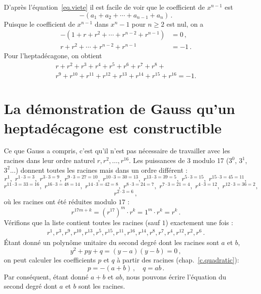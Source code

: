 D'après l'équation~\ref{eq.viete} il est facile de voir que le coefficient de $x^{n-1}$ est 
\[
-(a_1+a_2+\cdots+a_{n-1}+a_n)\,.
\]
Puisque le coefficient de $x^{n-1}$ dans $x^n-1$ pour $n\geq 2$ est nul, on a 
\begin{align*}
-(1+r+r^2+\cdots + r^{n-2}+r^{n-1})&=0\,,\\
r+r^2+\cdots + r^{n-2}+r^{n-1}&=-1\,.
\end{align*}
Pour l'heptadécagone, on obtient
\begin{multline}
r+r^2+r^3+r^4+r^5+r^6+r^7+r^8+\\
r^9+r^{10}+r^{11}+r^{12}+r^{13}+r^{14} + r^{15}+r^{16}=-1.\label{eq.minus-one}
\end{multline}

\section{La démonstration de Gauss qu'un heptadécagone est constructible}\label{s.gauss}

Ce que Gauss a compris, c'est qu'il n'est pas nécessaire de travailler avec les racines dans leur ordre naturel $r,r^2,\ldots,r^{16}$. Les puissances de $3$ modulo 17 ($3^0$, $3^1$, $3^2$...) donnent toutes les racines mais dans un ordre différent :
\[
r^1, \;r^{1\cdot 3 =3},\; r^{3\cdot 3=9},\; r^{9\cdot 3=27=10},\; r^{10\cdot 3=30=13},\; r^{13\cdot 3=39=5},\; r^{5\cdot 3=15},\; r^{15\cdot 3=45=11},\]
\[
r^{11\cdot 3 =33=16}, \;r^{16\cdot 3=48=14},\; r^{14\cdot 3=42=8},\; r^{8\cdot 3=24=7},\;r^{7\cdot 3=21=4},\; r^{4\cdot 3=12},\; r^{12\cdot 3=36=2},\; \]
\[r^{2\cdot 3=6}\,,\]
où les racines ont été réduites modulo $17$ :
\[
r^{17m+k}=(r^{17})^m\cdot r^k=1^m\cdot r^k=r^k\,.
\]
Vérifions que la liste contient toutes les racines (sauf $1$) exactement une fois :
\begin{align}\label{eq.roots}
r^1, r^3, r^9, r^{10}, r^{13}, r^5, r^{15}, r^{11}, r^{16}, r^{14}, r^8, r^7, r^4, r^{12}, r^2, r^6\,.
\end{align}
Étant donné un polynôme unitaire du second degré  dont les racines sont $a$ et $b$,
\[
y^2+py+q=(y-a)(y-b)=0\,,
\]
on peut calculer les coefficients $p$ et $q$ à partir des racines 
 (chap.~\ref{c.quadratic}):
\[
p=-(a+b)\,,\quad q=ab\,.
\]
Par conséquent, étant donné $a+b$ et $ab$, nous pouvons écrire l'équation du second degré dont $a$ et $b$ sont les racines.

